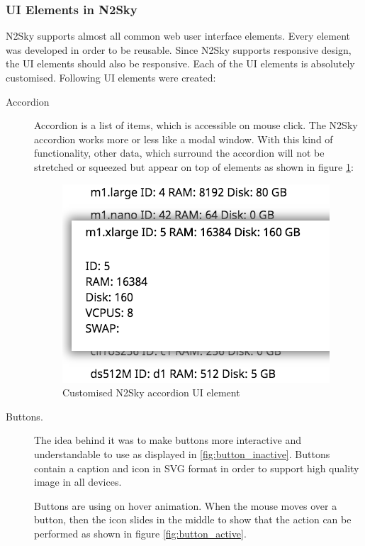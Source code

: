 \subsubsection{UI Elements in N2Sky}\label{UI Elements in N2Sky}

N2Sky supports almost all common web user interface elements. Every element was developed in order to be reusable. Since N2Sky supports responsive design, the UI elements should also be responsive. Each of the UI elements is absolutely customised. Following UI elements were created:

\begin{description}
\item[Accordion]  Accordion is a list of items, which is accessible on mouse click. The N2Sky accordion works more or less like a modal window. With this kind of functionality, other data, which surround the accordion will not be stretched or squeezed but appear on top of elements as shown in figure \ref{fig:accordion}: 

\begin{figure}[htbp]
\begin{center}
  \includegraphics[scale=0.75]{components/3/components/accordion.png}
  \caption{Customised N2Sky accordion UI element}
  \label{fig:accordion}
\end{center}
\end{figure}

\item[Buttons.] The idea behind it was to make buttons more interactive and understandable to use as displayed in \ref{fig:button_inactive}. Buttons contain a caption and icon in SVG format in order to support high quality image in all devices.

Buttons are using on hover animation. When the mouse moves over a button, then the icon slides in the middle to show that the action can be performed as shown in figure \ref{fig:button_active}. 


\end{description}
